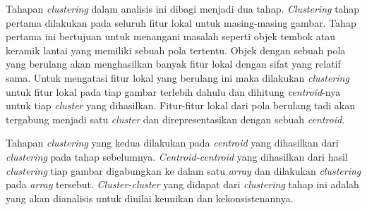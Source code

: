 Tahapan \textit{clustering} dalam analisis ini dibagi menjadi dua tahap. \textit{Clustering} tahap pertama dilakukan pada seluruh fitur lokal untuk masing-masing gambar. Tahap pertama ini bertujuan untuk menangani masalah seperti objek tembok atau keramik lantai yang memiliki sebuah pola tertentu. Objek dengan sebuah pola yang berulang akan menghasilkan banyak fitur lokal dengan sifat yang relatif sama. Untuk mengatasi fitur lokal yang berulang ini maka dilakukan \textit{clustering} untuk fitur lokal pada tiap gambar terlebih dahulu dan dihitung \textit{centroid}-nya untuk tiap \textit{cluster} yang dihasilkan. Fitur-fitur lokal dari pola berulang tadi akan tergabung menjadi satu \textit{cluster} dan direpresentasikan dengan sebuah \textit{centroid}. 

Tahapan \textit{clustering} yang kedua dilakukan pada \textit{centroid} yang dihasilkan dari \textit{clustering} pada tahap sebelumnya. \textit{Centroid-centroid} yang dihasilkan dari hasil \textit{clustering} tiap gambar digabungkan ke dalam satu \textit{array} dan dilakukan \textit{clustering} pada \textit{array} tersebut. \textit{Cluster-cluster} yang didapat dari \textit{clustering} tahap ini adalah yang akan dianalisis untuk dinilai keunikan dan kekonsistenannya.

